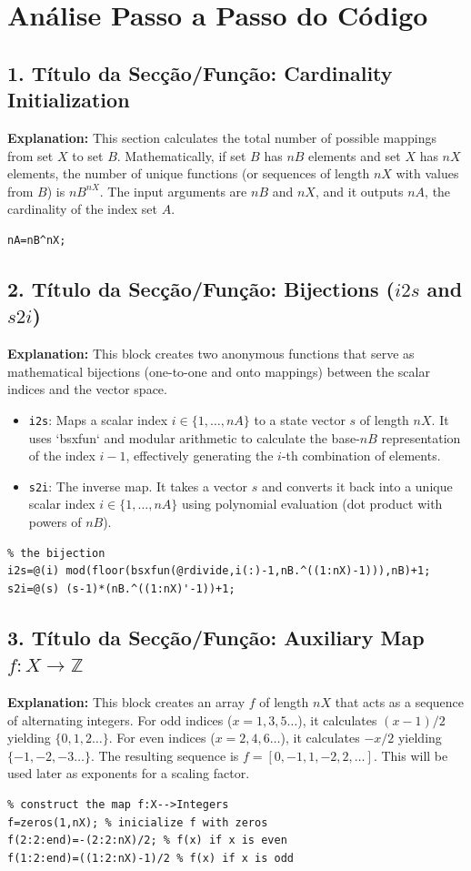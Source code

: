 \section{Análise Passo a Passo do Código}

\subsection{1. Título da Secção/Função: Cardinality Initialization}
\textbf{Explanation:} This section calculates the total number of possible mappings from set $X$ to set $B$. Mathematically, if set $B$ has $nB$ elements and set $X$ has $nX$ elements, the number of unique functions (or sequences of length $nX$ with values from $B$) is $nB^{nX}$. The input arguments are $nB$ and $nX$, and it outputs $nA$, the cardinality of the index set $A$.
\begin{lstlisting}
nA=nB^nX;
\end{lstlisting}


\subsection{2. Título da Secção/Função: Bijections ($i2s$ and $s2i$)}
\textbf{Explanation:} This block creates two anonymous functions that serve as mathematical bijections (one-to-one and onto mappings) between the scalar indices and the vector space. 
\begin{itemize}
    \item \texttt{i2s}: Maps a scalar index $i \in \{1, \dots, nA\}$ to a state vector $s$ of length $nX$. It uses `bsxfun` and modular arithmetic to calculate the base-$nB$ representation of the index $i-1$, effectively generating the $i$-th combination of elements.
    \item \texttt{s2i}: The inverse map. It takes a vector $s$ and converts it back into a unique scalar index $i \in \{1, \dots, nA\}$ using polynomial evaluation (dot product with powers of $nB$).
\end{itemize}
\begin{lstlisting}
% the bijection
i2s=@(i) mod(floor(bsxfun(@rdivide,i(:)-1,nB.^((1:nX)-1))),nB)+1;
s2i=@(s) (s-1)*(nB.^((1:nX)'-1))+1;
\end{lstlisting}


\subsection{3. Título da Secção/Função: Auxiliary Map $f: X \to \mathbb{Z}$}
\textbf{Explanation:} This block creates an array $f$ of length $nX$ that acts as a sequence of alternating integers. For odd indices ($x=1, 3, 5 \dots$), it calculates $(x-1)/2$ yielding $\{0, 1, 2 \dots\}$. For even indices ($x=2, 4, 6 \dots$), it calculates $-x/2$ yielding $\{-1, -2, -3 \dots\}$. The resulting sequence is $f = [0, -1, 1, -2, 2, \dots]$. This will be used later as exponents for a scaling factor.
\begin{lstlisting}
% construct the map f:X-->Integers
f=zeros(1,nX); % inicialize f with zeros
f(2:2:end)=-(2:2:nX)/2; % f(x) if x is even
f(1:2:end)=((1:2:nX)-1)/2 % f(x) if x is odd
\end{lstlisting}


